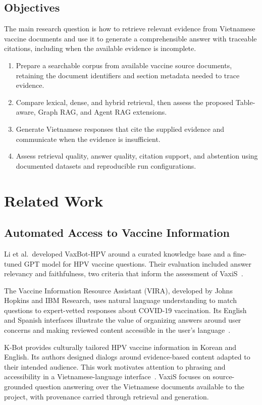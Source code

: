 \documentclass[oneside]{sn-jnl}
\begin{document}
\subsection{Objectives}
The main research question is how to retrieve relevant evidence from Vietnamese vaccine documents and use it to generate a comprehensible answer with traceable citations, including when the available evidence is incomplete.

\begin{enumerate}
\item Prepare a searchable corpus from available vaccine source documents, retaining the document identifiers and section metadata needed to trace evidence.
\item Compare lexical, dense, and hybrid retrieval, then assess the proposed Table-aware, Graph RAG, and Agent RAG extensions.
\item Generate Vietnamese responses that cite the supplied evidence and communicate when the evidence is insufficient.
\item Assess retrieval quality, answer quality, citation support, and abstention using documented datasets and reproducible run configurations.
\end{enumerate}

\section{Related Work}

\subsection{Automated Access to Vaccine Information}
Li et al.\ developed VaxBot-HPV around a curated knowledge base and a fine-tuned GPT model for HPV vaccine questions. Their evaluation included answer relevancy and faithfulness, two criteria that inform the assessment of VaxiS~\cite{li2025vaxbothpv}.

The Vaccine Information Resource Assistant (VIRA), developed by Johns Hopkins and IBM Research, uses natural language understanding to match questions to expert-vetted responses about COVID-19 vaccination. Its English and Spanish interfaces illustrate the value of organizing answers around user concerns and making reviewed content accessible in the user's language~\cite{jhuvira}.

K-Bot provides culturally tailored HPV vaccine information in Korean and English. Its authors designed dialogs around evidence-based content adapted to their intended audience. This work motivates attention to phrasing and accessibility in a Vietnamese-language interface~\cite{kim2025kbot}. VaxiS focuses on source-grounded question answering over the Vietnamese documents available to the project, with provenance carried through retrieval and generation.
\end{document}
